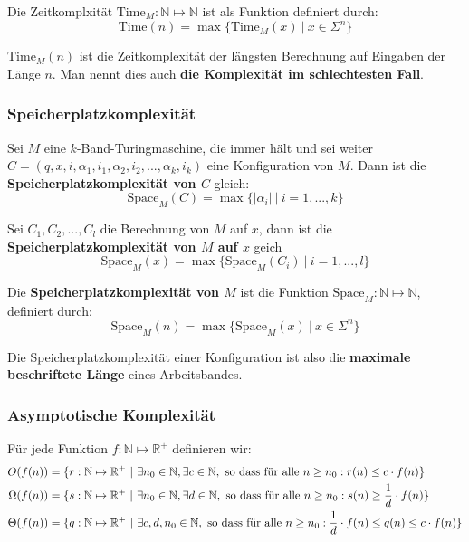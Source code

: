 \documentclass[11pt]{article}
\newcommand{\ttc}{\text{Time}}
\newcommand{\tsc}{\text{Space}}
\begin{document}
Die Zeitkomplxit{\"a}t $\ttc_M: \mathbb{N} \mapsto \mathbb{N}$ ist als Funktion definiert durch:
\begin{equation*}
	\ttc(n) = \max\{\ttc_M(x)\ |\ x \in \Sigma^n\}
\end{equation*}

$\ttc_M(n)$ ist die Zeitkomplexit{\"a}t der l{\"a}ngsten Berechnung auf Eingaben der L{\"a}nge $n$. Man nennt dies auch \textbf{die Komplexit{\"a}t im schlechtesten Fall}.

\subsubsection{Speicherplatzkomplexit{\"a}t}

Sei $M$ eine $k$-Band-Turingmaschine, die immer h{\"a}lt und sei weiter $C = (q, x, i, \alpha_1, i_1, \alpha_2, i_2,..., \alpha_k, i_k)$ eine Konfiguration von $M$. Dann ist die \textbf{Speicherplatzkomplexit{\"a}t von $C$} gleich:
\begin{equation*}
	\tsc_M(C) = \max\{|\alpha_i|\ |\ i = 1,...,k\}
\end{equation*}

Sei $C_1, C_2,..., C_l$ die Berechnung von $M$ auf $x$, dann ist die \textbf{Speicherplatzkomplexit{\"a}t von $M$ auf $x$} geich
\begin{equation*}
	\tsc_M(x) = \max\{\tsc_M(C_i)\ |\ i = 1,...,l\}
\end{equation*}

Die \textbf{Speicherplatzkomplexit{\"a}t von $M$} ist die Funktion $\tsc_M: \mathbb{N} \mapsto \mathbb{N}$, definiert durch:
\begin{equation*}
	\tsc_M(n) = \max\{\tsc_M(x)\ |\ x \in \Sigma^n\}
\end{equation*}

Die Speicherplatzkomplexit{\"a}t einer Konfiguration ist also die \textbf{maximale beschriftete L{\"a}nge} eines Arbeitsbandes.

\subsubsection{Asymptotische Komplexit{\"a}t}

F{\"u}r jede Funktion $f: \mathbb{N} \mapsto \mathbb{R}^+$ definieren wir:
\begin{equation*}
\begin{split}
	O(f(n)) & = \{r: \mathbb{N} \mapsto \mathbb{R}^+\ |\ \exists n_0 \in \mathbb{N}, \exists c \in \mathbb{N}, \text{ so dass f{\"u}r alle $n \geq n_0: r(n) \leq c\cdot f(n)$}\}  \\
	\Omega(f(n)) & = \{s: \mathbb{N} \mapsto \mathbb{R}^+\ |\ \exists n_0 \in \mathbb{N}, \exists d \in \mathbb{N}, \text{ so dass f{\"u}r alle $n \geq n_0: s(n) \geq \frac{1}{d}\cdot f(n)$}\}  \\
	\Theta(f(n)) & = \{q: \mathbb{N} \mapsto \mathbb{R}^+\ |\ \exists c,d,n_0 \in \mathbb{N}, \text{ so dass f{\"u}r alle $ n \geq n_0: \frac{1}{d}\cdot f(n) \leq q(n) \leq c\cdot f(n)$}\}  \\
\end{split}
\end{equation*}
\end{document}
